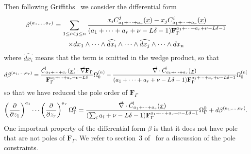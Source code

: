 \documentclass[a4paper,12pt]{article}
\numberwithin{equation}{section}
\numberwithin{figure}{section}
\begin{document}
     
   Then following Griffiths~\cite{Griffith1,Griffith2} we consider the differential form
   \begin{multline}\label{e:betadef}
  \beta^{(a_1,\dots,a_r)}=  \sum_{1\leq i<j\leq n} {x_i
    C_{a_1+\cdots+a_r}^j  (\underline x)-x_j
    C_{a_1+\cdots+a_r}^i(\underline x)\over  (a_1+\cdots+a_r+\nu-L\delta-1)\textbf{F}_\Gamma^{a_1+\cdots+a_r+\nu-L\delta-1}}\cr\times
 dx_1\wedge \cdots \wedge \widehat{dx_i}\wedge \cdots \wedge\widehat{dx_j}\wedge
  \cdots \wedge dx_n
   \end{multline}
where $\widehat{dx_i}$ means that the term is omitted in the wedge
product,   so that
   \begin{equation}
     d\beta^{(a_1,\dots,a_r)}= {  \vec   C_{a_1+\cdots+a_r}
     (\underline x)
\cdot    \vec \nabla\textbf{F}_\Gamma\over
     \textbf{F}_\Gamma^{a_1+\cdots+a_r+\nu-L\delta}}\Omega_0^{(n)}-{
\vec\nabla \cdot \vec C_{a_1+\cdots+a_r}
     (\underline x)
    \over    (a_1+\cdots+a_r+\nu-L\delta-1)\textbf{F}_\Gamma^{a_1+\cdots+a_r+\nu-L\delta-1}} \Omega_0^{(n)}
   \end{equation}
   so that we have reduced the pole order  of $ \textbf{F}_\Gamma$
   \begin{equation}\label{e:GDstart}
\left(\partial\over \partial z_1\right)^{a_1}\cdots\left(\partial
  \over\partial z_r\right)^{a_r} \Omega^0_\Gamma= {\vec\nabla \cdot
  \vec C_{a_1+\cdots+a_r} (\underline x)
  \over   (\sum_i a_i+\nu-L\delta-1)\textbf{F}_\Gamma^{a_1+\cdots +a_r+\nu-L\delta-1}}   \Omega_\Gamma^0+d\beta^{(a_1,\dots,a_r)}.
\end{equation}
One important property of the differential form $\beta$ is that it
does not have pole that are not poles of $\textbf{F}_\Gamma$. We refer
to section~3 of~\cite{Lairez:2022zkj} for a discussion of the pole constraints.
\end{document}
